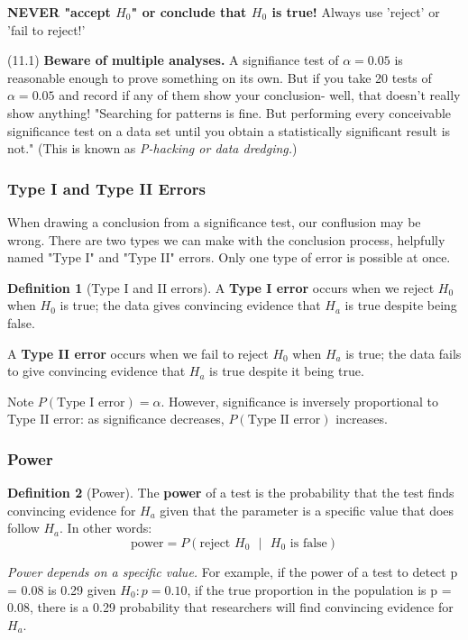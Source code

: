 \documentclass[12pt, a4paper]{article}
\theoremstyle{definition}
\newtheorem{definition}{Definition}
\begin{document}
\textbf{NEVER "accept $H_0$" or conclude that $H_0$ is true!} Always use 'reject' or 'fail to reject!'

(11.1) \textbf{Beware of multiple analyses.} A signifiance test of $\alpha = 0.05$ is reasonable enough to prove something on its own.
But if you take 20 tests of $\alpha = 0.05$ and record if any of them show your conclusion- well, that doesn't really show anything! "Searching for patterns is fine. But performing every conceivable significance test on a data set until you obtain a statistically significant result is not."
(This is known as \textit{P-hacking or data dredging.})

\subsubsection{Type I and Type II Errors}
When drawing a conclusion from a significance test, our conflusion may be wrong.
There are two types we can make with the conclusion process, helpfully named "Type I" and "Type II" errors. Only one type of error is possible at once.

\begin{definition}[Type I and II errors]
    A \textbf{Type I error} occurs when we reject $H_0$ when $H_0$ is true; the data gives convincing evidence that $H_a$ is true despite being false.
    
    A \textbf{Type II error} occurs when we fail to reject $H_0$ when $H_a$ is true; the data fails to give convincing evidence that $H_a$ is true despite it being true.
\end{definition}

Note $P(\textrm{Type I error}) = \alpha$.
However, significance is inversely proportional to Type II error: as significance decreases, $P(\textrm{Type II error})$ increases.

\subsubsection{Power}
\begin{definition}[Power]
    The \textbf{power} of a test is the probability that the test finds convincing evidence for $H_a$ given that the parameter is a specific value that does follow $H_a$. In other words:
    \[\textrm{power} = P(\textrm{reject $H_0$ $|$ $H_0$ is false})\]
\end{definition}

\textit{Power depends on a specific value.} For example, if the power of a test to detect p = 0.08 is 0.29 given $H_0: p = 0.10$, if the true proportion in the population is p = 0.08, there is a 0.29 probability that researchers will find convincing evidence for $H_a$.
\end{document}
